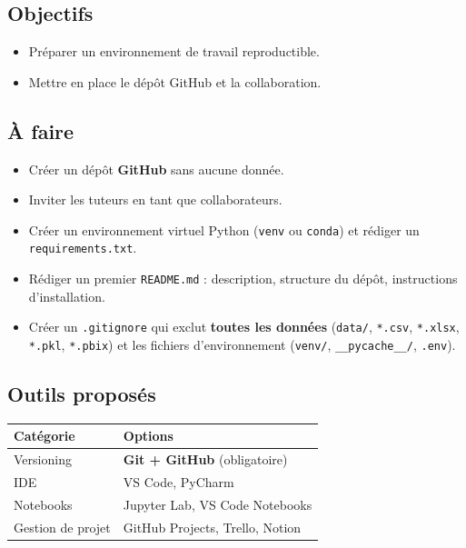 \documentclass[11pt,a4paper]{article}
\providecommand{\tightlist}{\setlength{\itemsep}{0pt}\setlength{\parskip}{0pt}}
\begin{document}
\subsection{Objectifs}\label{objectifs}

\begin{itemize}
\tightlist
\item
  Préparer un environnement de travail reproductible.
\item
  Mettre en place le dépôt GitHub et la collaboration.
\end{itemize}

\subsection{À faire}\label{uxe0-faire}

\begin{itemize}
\tightlist
\item
  Créer un dépôt \textbf{GitHub} sans aucune donnée.
\item
  Inviter les tuteurs en tant que collaborateurs.
\item
  Créer un environnement virtuel Python (\texttt{venv} ou
  \texttt{conda}) et rédiger un \texttt{requirements.txt}.
\item
  Rédiger un premier \texttt{README.md} : description, structure du
  dépôt, instructions d'installation.
\item
  Créer un \texttt{.gitignore} qui exclut \textbf{toutes les données}
  (\texttt{data/}, \texttt{*.csv}, \texttt{*.xlsx}, \texttt{*.pkl},
  \texttt{*.pbix}) et les fichiers d'environnement (\texttt{venv/},
  \texttt{\_\_pycache\_\_/}, \texttt{.env}).
\end{itemize}

\subsection{Outils proposés}\label{outils-proposuxe9s}

{\def\LTcaptype{none} %
\begin{longtable}[]{@{}ll@{}}
\toprule\noalign{}
Catégorie & Options \\
\midrule\noalign{}
\endhead
\bottomrule\noalign{}
\endlastfoot
Versioning & \textbf{Git + GitHub} (obligatoire) \\
IDE & VS Code, PyCharm \\
Notebooks & Jupyter Lab, VS Code Notebooks \\
Gestion de projet & GitHub Projects, Trello, Notion \\
\end{longtable}
}
\end{document}
